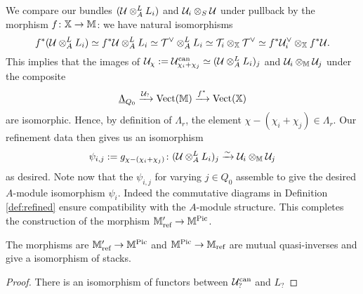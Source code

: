 \documentclass[12pt]{amsart}
\begin{document}
We compare our bundles $(\mathcal{U} \otimes_A^L L_i)$ and $\mathcal{U}_i \otimes_S \mathcal{U}$ under pullback by the morphism $f \colon \mathbb{X} \rightarrow \mathbb{M}$: we have natural isomorphisms
\begin{equation} \label{eq:natisolinebdls}
f^*(\mathcal{U} \otimes_A^L L_i) \simeq f^* \mathcal{U} \otimes_A^L L_i \simeq 
\mathcal{T}^{\vee} \otimes_A^L L_i \simeq \mathcal{T}_i \otimes_{\mathbb{X}} \mathcal{T}^{\vee} \simeq 
f^*\mathcal{U}_{i}^{\vee} \otimes_{\mathbb{X}} f^* \mathcal{U}.
\end{equation}
This implies that the images of $\mathcal{U}_\chi:= \mathcal{U}_{\chi_i + \chi_j}^\text{can} \simeq (\mathcal{U} \otimes_A^L L_i)_j$ and $\mathcal{U}_i \otimes_{\mathbb{M}} \mathcal{U}_j$ under the composite $$\underline{\Lambda}_{Q_0} \xrightarrow{\mathcal{U}_?} \operatorname{Vect}(\mathbb{M}) \xrightarrow{f^*} \operatorname{Vect}(\mathbb{X})$$ are isomorphic.
Hence, by definition of $\Lambda_r$, the element $\chi-(\chi_i+\chi_j) \in \Lambda_r$.
Our refinement data then gives us an isomorphism $$\psi_{i,j}:= g_{\chi-(\chi_i+\chi_j)} \colon (\mathcal{U} \otimes_A^L L_i)_j \xrightarrow{\sim} \mathcal{U}_i \otimes_{\mathbb{M}} \mathcal{U}_j$$ as desired.
Note now that the $\psi_{i,j}$ for varying $j \in Q_0$ assemble to give the desired $A$-module isomorphism $\psi_i$. 
Indeed the commutative diagrams in Definition \ref{def:refined} ensure compatibility with the $A$-module structure. 
This completes the construction of the morphism $\mathbb{M}'_{\text{ref}} \rightarrow \mathbb{M}^{\operatorname{Pic}}$.

\begin{theorem}
The morphisms are $\mathbb{M}'_{\text{ref}} \rightarrow \mathbb{M}^{\operatorname{Pic}}$ and $\mathbb{M}^{\operatorname{Pic}} \rightarrow \mathbb{M}_\text{ref}$ are mutual quasi-inverses and give a isomorphism of stacks. 
\end{theorem}

\begin{proof}
 There is an isomorphism of functors between $\mathcal{U}_?^\text{can}$ and $L_?$
\end{proof}



\end{document}
